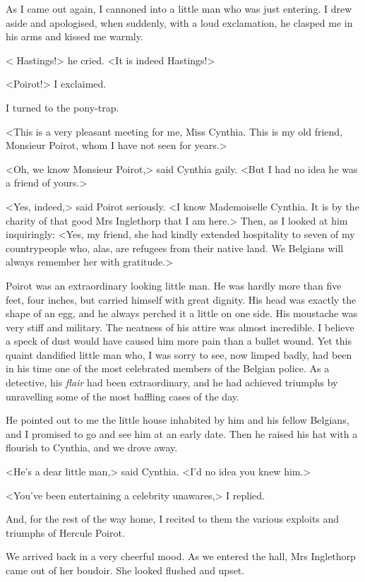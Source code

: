  As I came out again, I cannoned into a little man who was just entering. I drew aside and apologised, when suddenly, with a loud exclamation, he clasped me in his arms and kissed me warmly. 

 < Hastings!> he cried. <It is indeed  Hastings!> 

 <Poirot!> I exclaimed. 

 I turned to the pony-trap. 

 <This is a very pleasant meeting for me, Miss Cynthia. This is my old friend, Monsieur Poirot, whom I have not seen for years.> 

 <Oh, we know Monsieur Poirot,> said Cynthia gaily. <But I had no idea he was a friend of yours.> 

 <Yes, indeed,> said Poirot seriously. <I know Mademoiselle Cynthia. It is by the charity of that good Mrs Inglethorp that I am here.> Then, as I looked at him inquiringly: <Yes, my friend, she had kindly extended hospitality to seven of my countrypeople who, alas, are refugees from their native land. We Belgians will always remember her with gratitude.> 

 Poirot was an extraordinary looking little man. He was hardly more than five feet, four inches, but carried himself with great dignity. His head was exactly the shape of an egg, and he always perched it a little on one side. His moustache was very stiff and military. The neatness of his attire was almost incredible. I believe a speck of dust would have caused him more pain than a bullet wound. Yet this quaint dandified little man who, I was sorry to see, now limped badly, had been in his time one of the most celebrated members of the Belgian police. As a detective, his \emph{flair} had been extraordinary, and he had achieved triumphs by unravelling some of the most baffling cases of the day. 

 He pointed out to me the little house inhabited by him and his fellow Belgians, and I promised to go and see him at an early date. Then he raised his hat with a flourish to Cynthia, and we drove away. 

 <He's a dear little man,> said Cynthia. <I'd no idea you knew him.> 

 <You've been entertaining a celebrity unawares,> I replied. 

 And, for the rest of the way home, I recited to them the various exploits and triumphs of Hercule Poirot. 

 We arrived back in a very cheerful mood. As we entered the hall, Mrs Inglethorp came out of her boudoir. She looked flushed and upset. 

